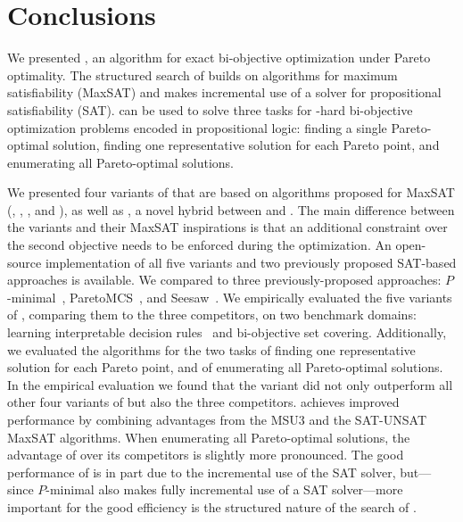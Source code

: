 \chapter{Conclusions\label{chap:conclusion}}

We presented \algname{}, an algorithm for exact bi-objective optimization under Pareto optimality.
The structured search of \algname{} builds on algorithms for maximum satisfiability (MaxSAT) and makes incremental use of a solver for propositional satisfiability (SAT).
\algname{} can be used to solve three tasks for \NP-hard bi-objective optimization problems encoded in propositional logic:
finding a single Pareto-optimal solution, finding one representative solution for each Pareto point, and enumerating all Pareto-optimal solutions.

We presented four variants of \algname{} that are based on algorithms proposed for MaxSAT (\satunsat{}, \unsatsat{}, \msu{}, and \oll{}), as well as \msh{}, a novel hybrid between \msu{} and \satunsat{}.
The main difference between the \algname{} variants and their MaxSAT inspirations is that an additional constraint over the second objective needs to be enforced during the optimization.
An open-source implementation of all five variants and two previously proposed SAT-based approaches is available.
We compared \algname{} to three previously-proposed approaches:
$P$-minimal~\autocite{DBLP:conf/cp/SohBTB17}, ParetoMCS~\autocite{DBLP:conf/ijcai/Terra-NevesLM18a}, and Seesaw~\autocite{DBLP:conf/cp/JanotaMSM21}.
We empirically evaluated the five variants of \algname{}, comparing them to the three competitors, on two benchmark domains: learning interpretable decision rules~\autocite{DBLP:conf/cp/MaliotovM18} and bi-objective set covering.
Additionally, we evaluated the algorithms for the two tasks of finding one representative solution for each Pareto point, and of enumerating all Pareto-optimal solutions.
In the empirical evaluation we found that the \msh{} variant did not only outperform all other four variants of \algname{} but also the three competitors.
\msh{} achieves improved performance by combining advantages from the MSU3 and the SAT-UNSAT MaxSAT algorithms.
When enumerating all Pareto-optimal solutions, the advantage of \algname{} over its competitors is slightly more pronounced.
The good performance of \algname{} is in part due to the incremental use of the SAT solver, but---since $P$-minimal also makes fully incremental use of a SAT solver---more important for the good efficiency is the structured nature of the search of \algname{}.

